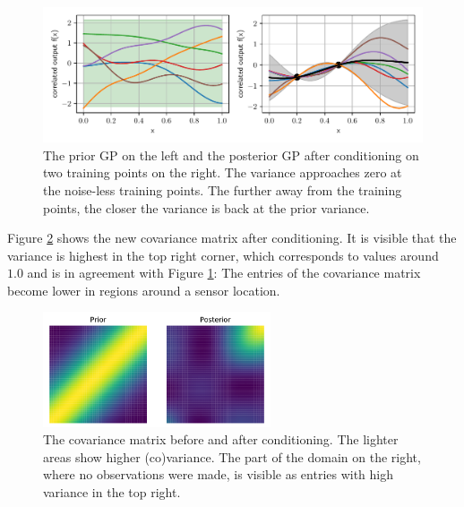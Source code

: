 \documentclass[%
  a4paper,oneside,%
  11pt,%
  smallchapters,
  style=printdev,
  extramargin,
  green,%
  rgb, <cmyk>
  ]{tubsbook}
\begin{document}
\begin{figure}[!ht]
\begin{center}

\includegraphics[width=1\textwidth]{pics/GPExpl}
\caption[Illustration of GP conditioning]{The prior GP on the left and the posterior GP after conditioning on two training points on the right. The variance approaches zero at the noise-less training points. The further away from the training points, the closer the variance is back at the prior variance.}
\label{fig:GPExpl}

\end{center}
\end{figure}

Figure \ref{fig:CovPOst} shows the new covariance matrix after conditioning. It is visible that the variance is highest in the top right corner, which corresponds to values around $1.0$ and is in agreement with Figure \ref{fig:GPExpl}: The entries of the covariance matrix become lower in regions around a sensor location.

\begin{figure}[!ht]
\begin{center}

\includegraphics[width=0.6\textwidth]{pics/CovPosterior}
\caption[Covariance Matrix before and after conditioning]{The covariance matrix before and after conditioning. The lighter areas show higher (co)variance. The part of the domain on the right, where no observations were made, is visible as entries with high variance in the top right.}
\label{fig:CovPOst}

\end{center}
\end{figure}
\end{document}
